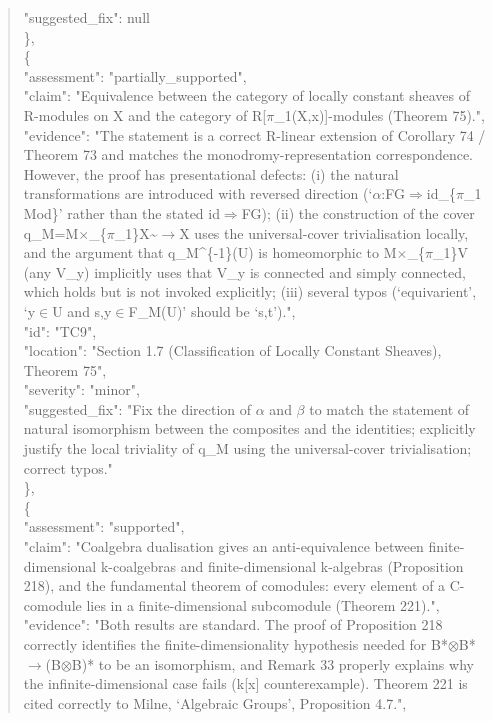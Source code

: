 \documentclass[11pt]{article}
\begin{document}
\begin{quote}
      "suggested\_fix": null\\
    \},\\
    \{\\
      "assessment": "partially\_supported",\\
      "claim": "Equivalence between the category of locally constant sheaves of R-modules on X and the category of R[\ensuremath{\pi}\_1(X,x)]-modules (Theorem 75).",\\
      "evidence": "The statement is a correct R-linear extension of Corollary 74 / Theorem 73 and matches the monodromy-representation correspondence. However, the proof has presentational defects: (i) the natural transformations are introduced with reversed direction (‘\ensuremath{\alpha}:FG\ensuremath{\Rightarrow}id\_\{\ensuremath{\pi}\_1 Mod\}’ rather than the stated id\ensuremath{\Rightarrow}FG); (ii) the construction of the cover q\_M=M\ensuremath{\times}\_\{\ensuremath{\pi}\_1\}X\~{}\ensuremath{\to}X uses the universal-cover trivialisation locally, and the argument that q\_M\^{}\{-1\}(U) is homeomorphic to M\ensuremath{\times}\_\{\ensuremath{\pi}\_1\}V (any V\_y) implicitly uses that V\_y is connected and simply connected, which holds but is not invoked explicitly; (iii) several typos (‘equivarient’, ‘y\ensuremath{\in}U and s,y\ensuremath{\in}F\_M(U)’ should be ‘s,t’).",\\
      "id": "TC9",\\
      "location": "Section 1.7 (Classification of Locally Constant Sheaves), Theorem 75",\\
      "severity": "minor",\\
      "suggested\_fix": "Fix the direction of \ensuremath{\alpha} and \ensuremath{\beta} to match the statement of natural isomorphism between the composites and the identities; explicitly justify the local triviality of q\_M using the universal-cover trivialisation; correct typos."\\
    \},\\
    \{\\
      "assessment": "supported",\\
      "claim": "Coalgebra dualisation gives an anti-equivalence between finite-dimensional k-coalgebras and finite-dimensional k-algebras (Proposition 218), and the fundamental theorem of comodules: every element of a C-comodule lies in a finite-dimensional subcomodule (Theorem 221).",\\
      "evidence": "Both results are standard. The proof of Proposition 218 correctly identifies the finite-dimensionality hypothesis needed for B*\ensuremath{\otimes}B*\ensuremath{\to}(B\ensuremath{\otimes}B)* to be an isomorphism, and Remark 33 properly explains why the infinite-dimensional case fails (k[x] counterexample). Theorem 221 is cited correctly to Milne, ‘Algebraic Groups’, Proposition 4.7.",\\

\end{quote}
\end{document}
